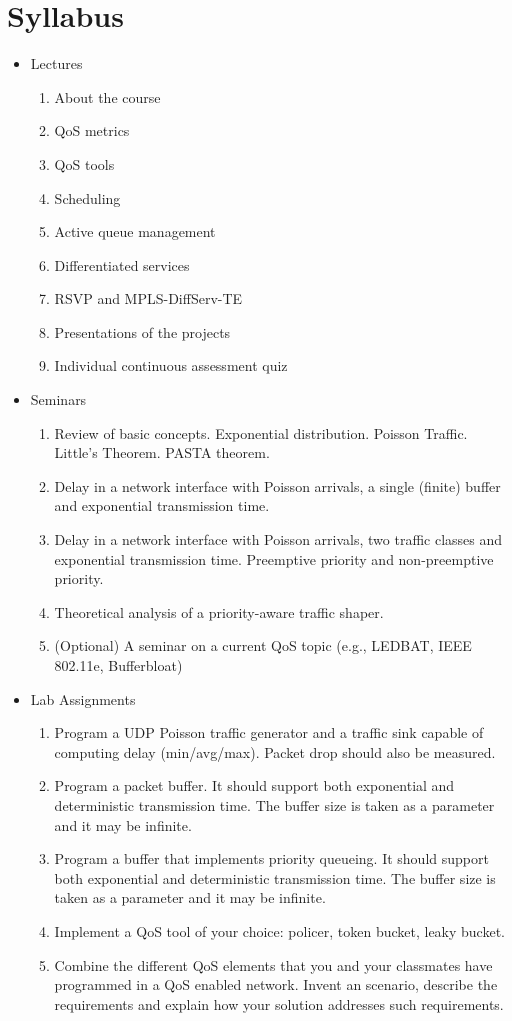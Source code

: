 \section{Syllabus}
\begin{itemize}
  \item Lectures
  \begin{enumerate}
    \item About the course
    \item QoS metrics
    \item QoS tools
    \item Scheduling
    \item Active queue management
    \item Differentiated services
    \item RSVP and MPLS-DiffServ-TE
    \item Presentations of the projects
    \item Individual continuous assessment quiz
  \end{enumerate}
  \item Seminars
  \begin{enumerate}
    \item Review of basic concepts. Exponential distribution. Poisson Traffic. Little's Theorem. PASTA theorem.
    \item Delay in a network interface with Poisson arrivals, a single (finite) buffer and exponential transmission time.
    \item Delay in a network interface with Poisson arrivals, two traffic classes and exponential transmission time. Preemptive priority and non-preemptive priority.
    \item Theoretical analysis of a priority-aware traffic shaper.
    \item (Optional) A seminar on a current QoS topic (e.g., LEDBAT, IEEE 802.11e, Bufferbloat)
  \end{enumerate}
\item Lab Assignments
  \begin{enumerate}
    \item Program a UDP Poisson traffic generator and a traffic sink capable of computing delay (min/avg/max). Packet drop should also be measured.
    \item Program a packet buffer. It should support both exponential and deterministic transmission time. The buffer size is taken as a parameter and it may be infinite.
    \item Program a buffer that implements priority queueing. It should support both exponential and deterministic transmission time. The buffer size is taken as a parameter and it may be infinite.
    \item Implement a QoS tool of your choice: policer, token bucket, leaky bucket.
    \item Combine the different QoS elements that you and your classmates have programmed in a QoS enabled network. Invent an scenario, describe the requirements and explain how your solution addresses such requirements.
  \end{enumerate}
\end{itemize}

